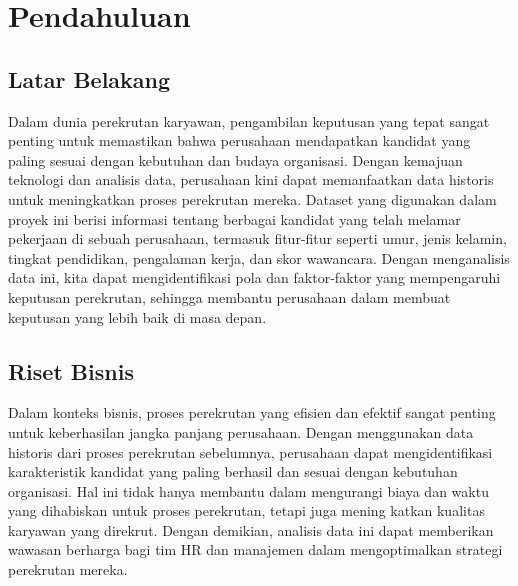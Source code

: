 \section{Pendahuluan}



\subsection{Latar Belakang}
Dalam dunia perekrutan karyawan, pengambilan keputusan yang tepat sangat penting untuk memastikan bahwa perusahaan mendapatkan kandidat yang paling sesuai dengan kebutuhan dan budaya organisasi. Dengan kemajuan teknologi dan analisis data, perusahaan kini dapat memanfaatkan data historis untuk meningkatkan proses perekrutan mereka. Dataset yang digunakan dalam proyek ini berisi informasi tentang berbagai kandidat yang telah melamar pekerjaan di sebuah perusahaan, termasuk fitur-fitur seperti umur, jenis kelamin, tingkat pendidikan, pengalaman kerja, dan skor wawancara. Dengan menganalisis data ini, kita dapat mengidentifikasi pola dan faktor-faktor yang mempengaruhi keputusan perekrutan, sehingga membantu perusahaan dalam membuat keputusan yang lebih baik di masa depan.

\subsection{Riset Bisnis}

Dalam konteks bisnis, proses perekrutan yang efisien dan efektif sangat penting untuk keberhasilan jangka panjang perusahaan. Dengan menggunakan data historis dari proses perekrutan sebelumnya, perusahaan dapat mengidentifikasi karakteristik kandidat yang paling berhasil dan sesuai dengan kebutuhan organisasi. Hal ini tidak hanya membantu dalam mengurangi biaya dan waktu yang dihabiskan untuk proses perekrutan, tetapi juga mening katkan kualitas karyawan yang direkrut. Dengan demikian, analisis data ini dapat memberikan wawasan berharga bagi tim HR dan manajemen dalam mengoptimalkan strategi perekrutan mereka.

